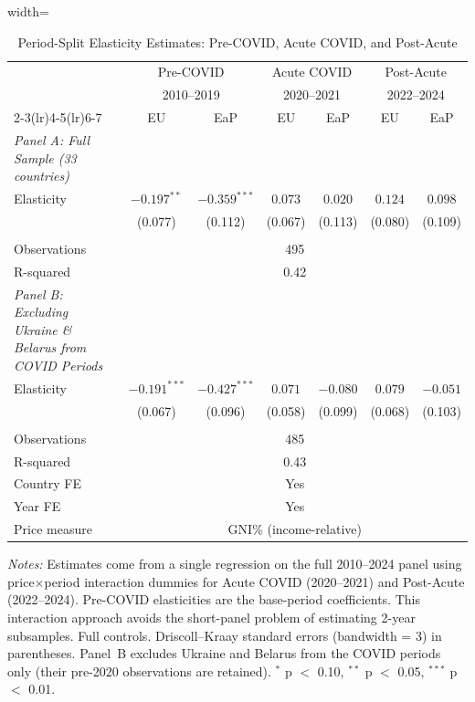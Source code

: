 \begin{table}[htbp]
\centering
\caption{Period-Split Elasticity Estimates: Pre-COVID, Acute COVID, and Post-Acute}
\label{tab:period_split}
\begin{minipage}{\textwidth}
\begin{adjustbox}{width=\textwidth}
\small
\begin{tabular}{lcccccc}
\toprule
& \multicolumn{2}{c}{Pre-COVID} & \multicolumn{2}{c}{Acute COVID} & \multicolumn{2}{c}{Post-Acute} \\
& \multicolumn{2}{c}{2010--2019} & \multicolumn{2}{c}{2020--2021} & \multicolumn{2}{c}{2022--2024} \\
\cmidrule(lr){2-3}\cmidrule(lr){4-5}\cmidrule(lr){6-7}
& EU & EaP & EU & EaP & EU & EaP \\
\midrule
\textit{Panel A: Full Sample (33 countries)} \\
Elasticity & $-0.197^{**}$ & $-0.359^{***}$ & $0.073$ & $0.020$ & $0.124$ & $0.098$ \\
& (0.077) & (0.112) & (0.067) & (0.113) & (0.080) & (0.109) \\
\\
Observations & \multicolumn{6}{c}{495} \\
R-squared   & \multicolumn{6}{c}{0.42} \\
\midrule
\textit{Panel B: Excluding Ukraine \& Belarus from COVID Periods} \\
Elasticity & $-0.191^{***}$ & $-0.427^{***}$ & $0.071$ & $-0.080$ & $0.079$ & $-0.051$ \\
& (0.067) & (0.096) & (0.058) & (0.099) & (0.068) & (0.103) \\
\\
Observations & \multicolumn{6}{c}{485} \\
R-squared   & \multicolumn{6}{c}{0.43} \\
\midrule
Country FE & \multicolumn{6}{c}{Yes} \\
Year FE    & \multicolumn{6}{c}{Yes} \\
Price measure & \multicolumn{6}{c}{GNI\% (income-relative)} \\
\bottomrule
\end{tabular}
\end{adjustbox}
\par\vspace{4pt}
\small
\textit{Notes:} Estimates come from a single regression on the full 2010--2024 panel
using price$\times$period interaction dummies for Acute COVID (2020--2021) and Post-Acute
(2022--2024). Pre-COVID elasticities are the base-period coefficients. This interaction
approach avoids the short-panel problem of estimating 2-year subsamples.
Full controls. Driscoll--Kraay standard errors (bandwidth = 3) in parentheses.
Panel~B excludes Ukraine and Belarus from the COVID periods only (their pre-2020
observations are retained). $^{*}$ p $<$ 0.10, $^{**}$ p $<$ 0.05, $^{***}$ p $<$ 0.01.
\end{minipage}
\end{table}
